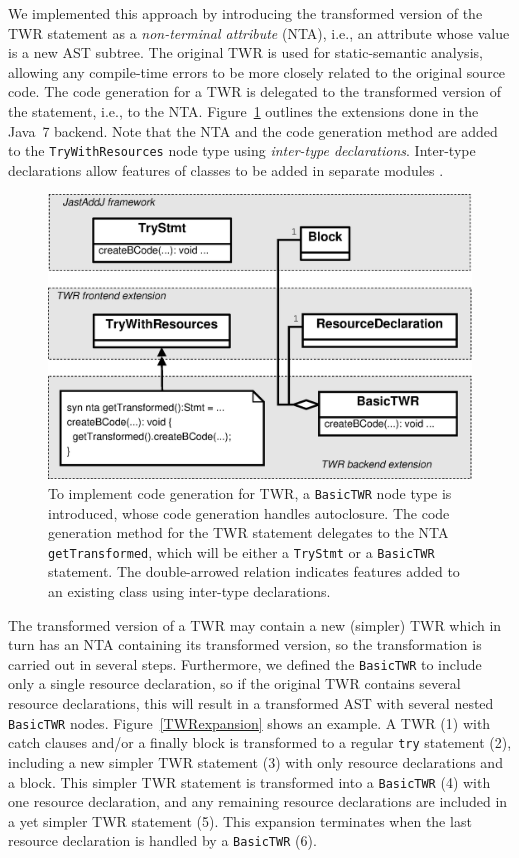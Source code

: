 {We implemented this approach by introducing the transformed version of the TWR statement as a \emph{non-terminal attribute} (NTA), i.e., an attribute whose value is a new AST subtree. The original TWR is used for static-semantic analysis, allowing any compile-time errors to be more closely related to the original source code. The code generation for a TWR is delegated to the transformed version of the statement, i.e., to the NTA. Figure~\ref{TWRbackend} outlines the extensions done in the Java~7 backend. Note that the NTA and the code generation method are added to the \texttt{TryWithResources} node type using \emph{inter-type declarations}. Inter-type declarations allow features of classes to be added in separate modules \cite{1997aspect}.

\begin{figure}
	\centering
	\includegraphics[width=\columnwidth]{figures/TWRextensionBackend.eps}
	\caption{To implement code generation for TWR, a \texttt{BasicTWR} node type is introduced, whose code generation handles autoclosure. The code generation method for the TWR statement delegates to the NTA \texttt{getTransformed}, which will be either a \texttt{TryStmt} or a \texttt{BasicTWR} statement. The double-arrowed relation indicates features added to an existing class using inter-type declarations.}
	\label{TWRbackend}
\end{figure}

The transformed version of a TWR may contain a new (simpler) TWR which in turn has an NTA containing its transformed version, so the transformation is carried out in several steps. Furthermore, we defined the \texttt{BasicTWR} to include only a single resource declaration, so if the original TWR contains several resource declarations, this will result in a transformed AST with several nested \texttt{BasicTWR} nodes. Figure~\ref{TWRexpansion} shows an example. A TWR (1) with catch clauses and/or a finally block is transformed to a regular \texttt{try} statement (2), including a new simpler TWR statement (3) with only resource declarations and a block. This simpler TWR statement is transformed into a \texttt{BasicTWR} (4) with one resource declaration, and any remaining resource declarations are included in a yet simpler TWR statement (5). This expansion terminates when the last resource declaration is handled by a \texttt{BasicTWR} (6).

}
